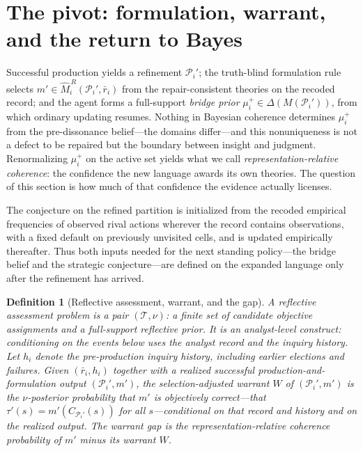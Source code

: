 \documentclass[11pt]{article}
\newtheorem{definition}[assumption]{Definition}
\theoremstyle{definition}
\begin{document}
\section{The pivot: formulation, warrant, and the return to Bayes}
\label{sec:pivot}

Successful production yields a refinement $\mathcal P_i'$; the truth-blind formulation rule selects $m'\in\widehat M_i^{\,R}(\mathcal P_i',\bar r_i)$ from the repair-consistent theories on the recoded record; and the agent forms a full-support \emph{bridge prior} $\mu_i^{+}\in\Delta(M(\mathcal P_i'))$, from which ordinary updating resumes.
Nothing in Bayesian coherence determines $\mu_i^{+}$ from the pre-dissonance belief---the domains differ---and this nonuniqueness is not a defect to be repaired but the boundary between insight and judgment.
Renormalizing $\mu_i^{+}$ on the active set yields what we call \emph{representation-relative coherence}: the confidence the new language awards its own theories.
The question of this section is how much of that confidence the evidence actually licenses.

The conjecture on the refined partition is initialized from the recoded empirical frequencies of observed rival actions wherever the record contains observations, with a fixed default on previously unvisited cells, and is updated empirically thereafter.
Thus both inputs needed for the next standing policy---the bridge belief and the strategic conjecture---are defined on the expanded language only after the refinement has arrived.

\begin{definition}[Reflective assessment, warrant, and the gap]
\label{def:warrant}
A reflective assessment problem is a pair $(\mathcal T,\nu)$: a finite set of candidate objective assignments and a full-support reflective prior.
It is an \emph{analyst-level} construct: conditioning on the events below uses the analyst record and the inquiry history.
Let $h_i$ denote the pre-production inquiry history, including earlier elections and failures.
Given $(\bar r_i,h_i)$ together with a realized successful production-and-formulation output $(\mathcal P_i',m')$, the \emph{selection-adjusted warrant} $W$ of $(\mathcal P_i',m')$ is the $\nu$-posterior probability that $m'$ is objectively correct---that $\tau'(s)=m'(C_{\mathcal P_i'}(s))$ for all $s$---conditional on that record \emph{and} history and on the realized output.
The \emph{warrant gap} is the representation-relative coherence probability of $m'$ minus its warrant $W$.
\end{definition}
\end{document}
